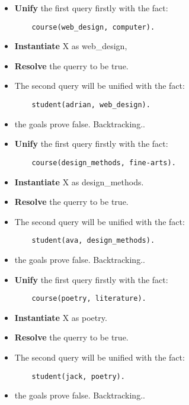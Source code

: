 \begin{itemize}
    \item \textbf{Unify} the first query firstly with the fact:
    \begin{lstlisting}
    course(web_design, computer).
    \end{lstlisting}
    \item \textbf{Instantiate} X as web\_design, 
    \item \textbf{Resolve} the querry to be true.
    \item The second query will be unified with the fact:
    \begin{lstlisting}
    student(adrian, web_design).
    \end{lstlisting}
    \item the goals prove false. Backtracking..
\end{itemize}

\begin{itemize}
    \item \textbf{Unify} the first query firstly with the fact:
    \begin{lstlisting}
    course(design_methods, fine-arts).
    \end{lstlisting}
    \item \textbf{Instantiate} X as design\_methods.
    \item \textbf{Resolve} the querry to be true.
    \item The second query will be unified with the fact:
    \begin{lstlisting}
    student(ava, design_methods).
    \end{lstlisting}
    \item the goals prove false. Backtracking..
\end{itemize}

\begin{itemize}
    \item \textbf{Unify} the first query firstly with the fact:
    \begin{lstlisting}
    course(poetry, literature).
    \end{lstlisting}
    \item \textbf{Instantiate} X as poetry.
    \item \textbf{Resolve} the querry to be true.
    \item The second query will be unified with the fact:
    \begin{lstlisting}
    student(jack, poetry).
    \end{lstlisting}
    \item the goals prove false. Backtracking..
\end{itemize}

